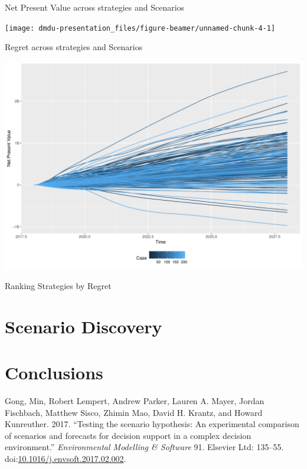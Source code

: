 \documentclass[12pt,ignorenonframetext,]{beamer}
\begin{document}
\begin{frame}{Net Present Value across strategies and Scenarios}

\begin{center}\texttt{[image: dmdu-presentation\_files/figure-beamer/unnamed-chunk-4-1]} \end{center}

\end{frame}

\begin{frame}{Regret across strategies and Scenarios}

\begin{center}\includegraphics{dmdu-presentation_files/figure-beamer/unnamed-chunk-5-1} \end{center}

\end{frame}

\begin{frame}{Ranking Strategies by Regret}

\end{frame}

\section{Scenario Discovery}\label{scenario-discovery}

\section*{Conclusions}\label{conclusions}

\hypertarget{refs}{}
\hypertarget{ref-Gong2017}{}
Gong, Min, Robert Lempert, Andrew Parker, Lauren A. Mayer, Jordan
Fischbach, Matthew Sisco, Zhimin Mao, David H. Krantz, and Howard
Kunreuther. 2017. ``Testing the scenario hypothesis: An experimental
comparison of scenarios and forecasts for decision support in a complex
decision environment.'' \emph{Environmental Modelling \& Software} 91.
Elsevier Ltd: 135--55.
doi:\href{https://doi.org/10.1016/j.envsoft.2017.02.002}{10.1016/j.envsoft.2017.02.002}.
\end{document}
